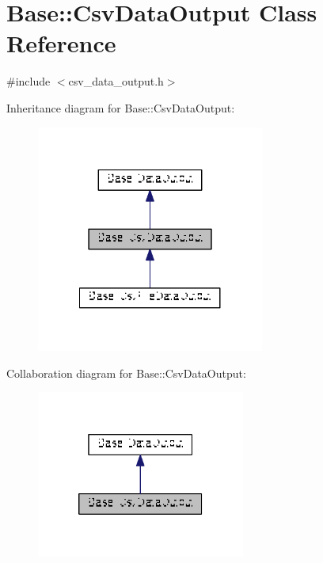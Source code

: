 \hypertarget{classBase_1_1CsvDataOutput}{\section{Base\-:\-:Csv\-Data\-Output Class Reference}
\label{classBase_1_1CsvDataOutput}
}


{\ttfamily \#include $<$csv\-\_\-data\-\_\-output.\-h$>$}



Inheritance diagram for Base\-:\-:Csv\-Data\-Output\-:\nopagebreak
\begin{figure}[H]
\begin{center}
\leavevmode
\includegraphics[width=212pt]{classBase_1_1CsvDataOutput__inherit__graph}
\end{center}
\end{figure}


Collaboration diagram for Base\-:\-:Csv\-Data\-Output\-:\nopagebreak
\begin{figure}[H]
\begin{center}
\leavevmode
\includegraphics[width=194pt]{classBase_1_1CsvDataOutput__coll__graph}
\end{center}
\end{figure}
